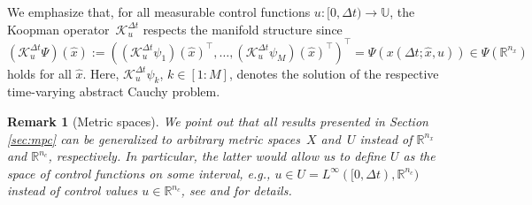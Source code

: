 \documentclass{article}
\numberwithin{equation}{section}
\newtheorem{remark}[theorem]{Remark}
\newcommand{\nx}{n_x}
\newcommand{\nc}{n_c}
\newcommand{\N}{M}
\newcommand{\bU}{\mathbb U}
\begin{document}
	We emphasize that, for all measurable control functions $u :[0,\Delta t)\to \bU$, the Koopman operator~$\mathcal{K}^{\Delta t}_u$ respects the manifold structure since $(\mathcal{K}^{\Delta t}_u \Psi)(\hat{x}) := ((\mathcal{K}^{\Delta t}_u\psi_1)(\hat x)^\top,\ldots,(\mathcal{K}^{\Delta t}_u\psi_\N)(\hat x)^\top)^\top =  \Psi(x(\Delta t;\hat{x},u)) \in \Psi(\mathbb{R}^{\nx})$ holds for all $\hat{x}$.
	Here, $\mathcal{K}^{\Delta t}_u\psi_k$, $k \in [1:\N]$, denotes the solution of the respective time-varying abstract Cauchy problem.
	
	\begin{remark}[Metric spaces]
		We point out that all results presented in Section \ref{sec:mpc} can be generalized to arbitrary metric spaces~$X$ and~$U$ instead of $\mathbb{R}^{\nx}$ and $\mathbb{R}^{\nc}$, respectively. In particular, the latter would allow us to define $U$ as the space of control functions on some interval, e.g., $u\in U= L^\infty([0,\Delta t),\mathbb{R}^{\nc})$ instead of control values $u \in \mathbb{R}^{\nc}$, see \cite{Wort11} and \cite[Chapter~2 and~3]{GrunPann17} for details.
	\end{remark}
	
\end{document}
